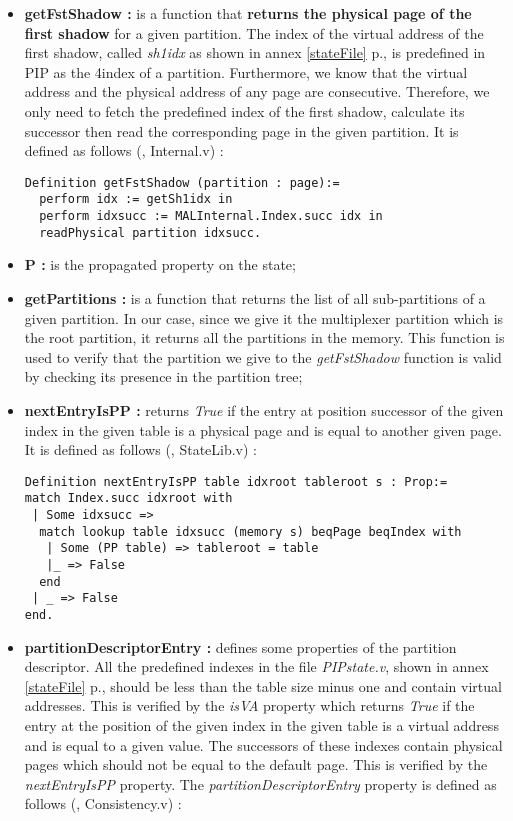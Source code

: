 \begin{itemize}
	\item \textbf{getFstShadow :} is a function that \textbf{returns the physical page of the first shadow} for a given partition. The index of the virtual address of the first shadow, called \textit{sh1idx} as shown in annex \ref{stateFile} p.\pageref{stateFile}, is predefined in PIP as the 4\rth index of a partition. Furthermore, we know that the virtual address and the physical address of any page are consecutive. Therefore, we only need to fetch the predefined index of the first shadow, calculate its successor then read the corresponding page in the given partition. It is defined as follows (\cite{PIP}, Internal.v) :
\begin{lstlisting}[caption = {getFstShadow function in the shallow embedding},label={getFstShallow}]
Definition getFstShadow (partition : page):=
  perform idx := getSh1idx in
  perform idxsucc := MALInternal.Index.succ idx in
  readPhysical partition idxsucc.
\end{lstlisting} 
\vspace{4pt}
	\item \textbf{P :} is the propagated property on the state;
	\item \textbf{getPartitions :}  is a function that returns the list of all sub-partitions of a given partition. In our case, since we give it the multiplexer partition which is the root partition, it returns all the partitions in the memory. This function is used to verify that the partition we give to the \textit{getFstShadow} function is valid by checking its presence in the partition tree;
	\item \textbf{nextEntryIsPP :}  returns \textit{True} if the entry at position successor of the given index in the given table is a physical page and is equal to another given page. It is defined as follows (\cite{PIP}, StateLib.v) : 
\begin{lstlisting}[caption = {nextEntryIsPP property},mathescape=true, xleftmargin=-.1\textwidth, xrightmargin=-.05\textwidth,label={nextEnt}]
Definition nextEntryIsPP table idxroot tableroot s : Prop:= 
match Index.succ idxroot with 
 | Some idxsucc => 
  match lookup table idxsucc (memory s) beqPage beqIndex with 
   | Some (PP table) => tableroot = table
   |_ => False 
  end
 | _ => False 
end.
\end{lstlisting} 
	\item \textbf{partitionDescriptorEntry :}  defines some properties of the partition descriptor. All the predefined indexes in the file \textit{PIPstate.v}, shown in annex \ref{stateFile} p.\pageref{stateFile}, should be less than the table size minus one and contain virtual addresses. This is verified by the \textit{isVA} property which returns \textit{True} if the entry at the position of the given index in the given table is a virtual address and is equal to a given value. The successors of these indexes contain physical pages which should not be equal to the default page. This is verified by the \textit{nextEntryIsPP} property. The \textit{partitionDescriptorEntry} property is defined as follows (\cite{PIP}, Consistency.v) :

\end{itemize}
